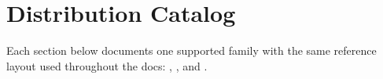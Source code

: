 \documentclass[letterpaper,10pt,english]{sphinxmanual}
\begin{document}
\sphinxstepscope


\chapter{Distribution Catalog}
\label{\detokenize{distribution_catalog:distribution-catalog}}\label{\detokenize{distribution_catalog::doc}}
\sphinxAtStartPar
Each section below documents one supported family with the same reference layout used throughout the docs: , , and .


\section{}
\label{\detokenize{distribution_catalog:normal}}
\end{document}
